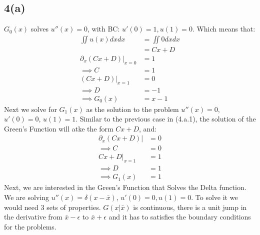 \documentclass[]{article}
\begin{document}
    \subsection*{4(a)}
        $G_0(x)$ solves $u''(x) = 0$, with BC: $u'(0) = 1, u(1) = 0$. Which means that: 
        \begin{align*}\tag{4.a.1}\label{eqn:4.a.1}
            \iint u(x)dxdx &=\iint 0 dxdx
            \\
            & = Cx + D 
            \\
            \left.\partial_x(Cx + D)\right|_{x = 0} &= 1
            \\
            \implies C &= 1
            \\
            \left.(Cx + D)\right|_{x =1} &= 0
            \\
            \implies D &= -1 
            \\
            \implies G_0(x) &= x - 1
        \end{align*}
        Next we solve for $G_1(x)$ as the solution to the problem $u''(x) = 0$, $u'(0) = 0$, $u(1) = 1$. Similar to the previous case in (4.a.1), the solution of the Green's Function will atke the form $Cx + D$, and: 
        \begin{align*}\tag{4.a.2}\label{eqn:4.a.2}
            \left.\partial_x (Cx + D)\right| &= 0
            \\
            \implies C &= 0
            \\
            \left. 
                Cx + D     
            \right|_{x = 1} &= 1
            \\
            \implies D &= 1
            \\
            \implies G_1(x) &= 1
        \end{align*}
        Next, we are interested in the Green's Function that Solves the Delta function. We are solving $u''(x) = \delta(x - \bar{x})$, $u'(0) = 0, u(1) = 0$. To solve it we would need 3 sets of properties. $G(x|\bar{x})$ is continuous, there is a unit jump in the derivative from $\bar{x} - \epsilon$ to $\bar{x} + \epsilon$ and it has to satisfies the boundary conditions for the problems. 
\end{document}
